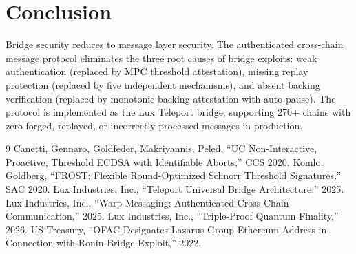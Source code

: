 \documentclass[11pt,a4paper]{article}
\begin{document}
\section{Conclusion}

Bridge security reduces to message layer security. The authenticated cross-chain message protocol eliminates the three root causes of bridge exploits: weak authentication (replaced by MPC threshold attestation), missing replay protection (replaced by five independent mechanisms), and absent backing verification (replaced by monotonic backing attestation with auto-pause). The protocol is implemented as the Lux Teleport bridge, supporting 270+ chains with zero forged, replayed, or incorrectly processed messages in production.

\begin{thebibliography}{9}
 Canetti, Gennaro, Goldfeder, Makriyannis, Peled, ``UC Non-Interactive, Proactive, Threshold ECDSA with Identifiable Aborts,'' CCS 2020.
 Komlo, Goldberg, ``FROST: Flexible Round-Optimized Schnorr Threshold Signatures,'' SAC 2020.
 Lux Industries, Inc., ``Teleport Universal Bridge Architecture,'' 2025.
 Lux Industries, Inc., ``Warp Messaging: Authenticated Cross-Chain Communication,'' 2025.
 Lux Industries, Inc., ``Triple-Proof Quantum Finality,'' 2026.
 US Treasury, ``OFAC Designates Lazarus Group Ethereum Address in Connection with Ronin Bridge Exploit,'' 2022.
\end{thebibliography}
\end{document}
